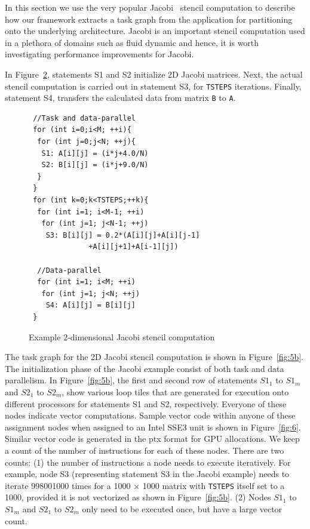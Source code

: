 \begin{figure}[t!]
{    \label{fig:5a}
  }
  \caption{}
  \label{fig:5}
\end{figure}

In this section we use the very popular Jacobi~\cite{jacobi2} stencil
computation to describe how our framework extracts a task graph from the
application for partitioning onto the underlying architecture. Jacobi is
an important stencil computation used in a plethora of domains such as
fluid dynamic and hence, it is worth investigating performance
improvements for Jacobi.

In Figure~\ref{fig:4}, statements S1 and S2 initialize 2D Jacobi
matrices. Next, the actual stencil computation is carried out in
statement S3, for \texttt{TSTEPS} iterations. Finally, statement S4,
transfers the calculated data from matrix \texttt{B} to \texttt{A}.

\begin{scriptsize}
  \begin{figure}[h!]
    \centering
\begin{verbatim}
 //Task and data-parallel
 for (int i=0;i<M; ++i){
  for (int j=0;j<N; ++j){
   S1: A[i][j] = (i*j+4.0/N)
   S2: B[i][j] = (i*j+9.0/N)
  }
 }
 for (int k=0;k<TSTEPS;++k){
  for (int i=1; i<M-1; ++i)
   for (int j=1; j<N-1; ++j)
    S3: B[i][j] = 0.2*(A[i][j]+A[i][j-1]
              +A[i][j+1]+A[i-1][j])

  //Data-parallel
  for (int i=1; i<M; ++i)
   for (int j=1; j<N; ++j)
    S4: A[i][j] = B[i][j]
 }
\end{verbatim}
    \caption{Example 2-dimensional Jacobi stencil computation}
    \label{fig:4}
  \end{figure}
\end{scriptsize}

The task graph for the 2D Jacobi stencil computation is shown in
Figure~\ref{fig:5b}. The initialization phase of the Jacobi example
consist of both task and data parallelism. In Figure~\ref{fig:5b}, the
first and second row of statements $S1_1$ to $S1_m$ and $S2_1$ to
$S2_m$, show various loop tiles that are generated for execution onto
different processors for statements S1 and S2, respectively. Everyone of
these nodes indicate vector computations. Sample vector code within
anyone of these assignment nodes when assigned to an Intel SSE3 unit is
shown in Figure~\ref{fig:6}. Similar vector code is generated in the ptx
format for GPU allocations. We keep a count of the number of
instructions for each of these nodes. There are two counts: (1) the
number of instructions a node needs to execute iteratively. For example,
node S3 (representing statement S3 in the Jacobi example) needs to
iterate 998001000 times for a 1000 $\times$ 1000 matrix with
\texttt{TSTEPS} itself set to a 1000, provided it is not vectorized as
shown in Figure~\ref{fig:5b}. (2) Nodes $S1_1$ to $S1_m$ and $S2_1$ to
$S2_m$ only need to be executed once, but have a large vector count.

